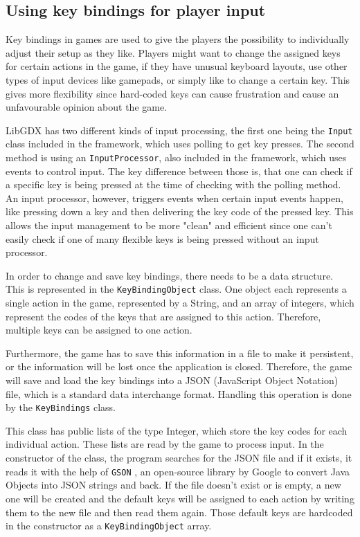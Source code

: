 \documentclass[12p]{article}
\begin{document}

\newpage
\subsection{Using key bindings for player input} \label{DocKeyBindings}

Key bindings in games are used to give the players the possibility to individually adjust their setup as they like. Players might want to change the assigned keys for certain actions in the game, if they have unusual keyboard layouts, use other types of input devices like gamepads, or simply like to change a certain key. This gives more flexibility since hard-coded keys can cause frustration and cause an unfavourable opinion about the game.

LibGDX has two different kinds of input processing, the first one being the \texttt{Input} class included in the framework, which uses polling to get key presses. The second method is using an \texttt{InputProcessor}, also included in the framework, which uses events to control input. The key difference between those is, that one can check if a specific key is being pressed at the time of checking with the polling method. An input processor, however, triggers events when certain input events happen, like pressing down a key and then delivering the key code of the pressed key. This allows the input management to be more "clean" and efficient since one can't easily check if one of many flexible keys is being pressed without an input processor.

In order to change and save key bindings, there needs to be a data structure. This is represented in the \texttt{KeyBindingObject} class. One object each represents a single action in the game, represented by a String, and an array of integers, which represent the codes of the keys that are assigned to this action. Therefore, multiple keys can be assigned to one action.

Furthermore, the game has to save this information in a file to make it persistent, or the information will be lost once the application is closed. Therefore, the game will save and load the key bindings into a JSON (JavaScript Object Notation) file, which is a standard data interchange format. Handling this operation is done by the \texttt{KeyBindings} class. 

This class has public lists of the type Integer, which store the key codes for each individual action. These lists are read by the game to process input. In the constructor of the class, the program searches for the JSON file and if it exists, it reads it with the help of \texttt{GSON} \cite{GSON}, an open-source library by Google to convert Java Objects into JSON strings and back. If the file doesn't exist or is empty, a new one will be created and the default keys will be assigned to each action by writing them to the new file and then read them again. Those default keys are hardcoded in the constructor as a \texttt{KeyBindingObject} array.
\end{document}
